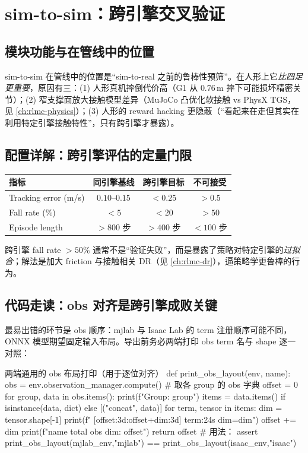 \section{sim-to-sim：跨引擎交叉验证}\label{sec:rlmc-hl-sim2sim}

\subsection{模块功能与在管线中的位置}
sim-to-sim 在管线中的位置是“sim-to-real 之前的鲁棒性预筛”。在人形上它\emph{比四足更重要}，原因有三：(1) 人形真机摔倒代价高（G1 从 $0.76$\,m 摔下可能损坏精密关节）；(2) 窄支撑面放大接触模型差异（MuJoCo 凸优化软接触 vs PhysX TGS，见 \cref{ch:rlmc-physics}）；(3) 人形的 reward hacking 更隐蔽（“看起来在走但其实在利用特定引擎接触特性”，只有跨引擎才暴露）。

\subsection{配置详解：跨引擎评估的定量门限}

\begin{center}
\small
\begin{tabular}{lccc}
\hline
指标 & 同引擎基线 & 跨引擎目标 & 不可接受 \\
\hline
Tracking error (m/s) & $0.10$--$0.15$ & $<0.25$ & $>0.5$ \\
Fall rate (\%) & $<5$ & $<20$ & $>50$ \\
Episode length & $>800$ 步 & $>400$ 步 & $<100$ 步 \\
\hline
\end{tabular}
\end{center}

跨引擎 fall rate $>50\%$ 通常不是“验证失败”，而是暴露了策略对特定引擎的\emph{过拟合}；解法是加大 friction 与接触相关 DR（见 \cref{ch:rlmc-dr}），逼策略学更鲁棒的行为。

\subsection{代码走读：obs 对齐是跨引擎成败关键}
最易出错的环节是 obs 顺序：mjlab 与 Isaac Lab 的 term 注册顺序可能不同，ONNX 模型期望固定输入布局。导出前务必两端打印 obs term 名与 shape 逐一对照：

\begin{codebox}[Python]{两端通用的 obs 布局打印（用于逐位对齐）}
def print_obs_layout(env, name):
    obs = env.observation_manager.compute()       # 取各 group 的 obs 字典
    offset = 0
    for group, data in obs.items():
        print(f"Group: {group}")
        items = data.items() if isinstance(data, dict) else [("concat", data)]
        for term, tensor in items:
            dim = tensor.shape[-1]
            print(f"  [{offset:3d}:{offset+dim:3d}] {term:24s} dim={dim}")
            offset += dim
    print(f"{name} total obs dim: {offset}")
    return offset
# 用法： assert print_obs_layout(mjlab_env,"mjlab") == print_obs_layout(isaac_env,"isaac")
\end{codebox}

